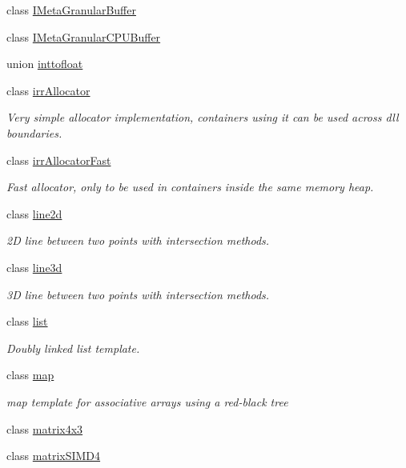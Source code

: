 \begin{DoxyCompactItemize}
class \hyperlink{classirr_1_1core_1_1IMetaGranularBuffer}{I\+Meta\+Granular\+Buffer}
\item 
class \hyperlink{classirr_1_1core_1_1IMetaGranularCPUBuffer}{I\+Meta\+Granular\+C\+P\+U\+Buffer}
\item 
union \hyperlink{unionirr_1_1core_1_1inttofloat}{inttofloat}
\item 
class \hyperlink{classirr_1_1core_1_1irrAllocator}{irr\+Allocator}
\begin{DoxyCompactList}\small\item\em Very simple allocator implementation, containers using it can be used across dll boundaries. \end{DoxyCompactList}\item 
class \hyperlink{classirr_1_1core_1_1irrAllocatorFast}{irr\+Allocator\+Fast}
\begin{DoxyCompactList}\small\item\em Fast allocator, only to be used in containers inside the same memory heap. \end{DoxyCompactList}\item 
class \hyperlink{classirr_1_1core_1_1line2d}{line2d}
\begin{DoxyCompactList}\small\item\em 2D line between two points with intersection methods. \end{DoxyCompactList}\item 
class \hyperlink{classirr_1_1core_1_1line3d}{line3d}
\begin{DoxyCompactList}\small\item\em 3D line between two points with intersection methods. \end{DoxyCompactList}\item 
class \hyperlink{classirr_1_1core_1_1list}{list}
\begin{DoxyCompactList}\small\item\em Doubly linked list template. \end{DoxyCompactList}\item 
class \hyperlink{classirr_1_1core_1_1map}{map}
\begin{DoxyCompactList}\small\item\em map template for associative arrays using a red-\/black tree \end{DoxyCompactList}\item 
class \hyperlink{classirr_1_1core_1_1matrix4x3}{matrix4x3}
\item 
class \hyperlink{classirr_1_1core_1_1matrixSIMD4}{matrix\+S\+I\+M\+D4}

\end{DoxyCompactItemize}
